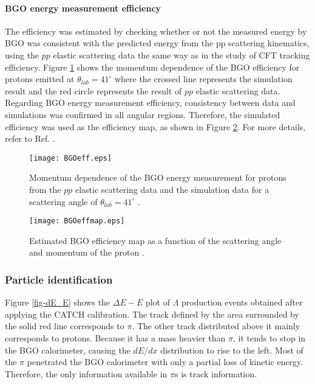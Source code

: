 \vspace{10pt}
\paragraph{BGO energy measurement efficiency }
The efficiency was estimated by checking whether or not the measured energy by BGO was consistent with the predicted energy from the pp scattering kinematics, using the $pp$ elastic scattering data the same way as in the study of CFT tracking efficiency. Figure \ref{fig-BGOeff}  shows the momentum dependence of the
BGO efficiency for protons emitted at $\theta_{lab}=41^{\circ}$ where the crossed line represents the simulation result and the red circle represents the result of $pp$ elastic scattering data. Regarding BGO energy measurement efficiency, consistency between data and simulations was confirmed in all angular regions. Therefore, the simulated efficiency was used as the efficiency map, as shown in Figure \ref{fig-BGOeffmap}. For more details, refer to Ref. \cite{Miwa-SMp}.

\begin{figure}[!h]
  \begin{center}
    \texttt{[image: BGOeff.eps]}
    \caption{Momentum dependence of the BGO energy measurement for protons from the $pp$ elastic scattering data and the simulation data for a scattering angle of $\theta_{lab}=41^{\circ}$ \cite{Miwa-SMp}.}
    \label{fig-BGOeff}
  \end{center}
\end{figure}

\begin{figure}[!h]
  \begin{center}
    \texttt{[image: BGOeffmap.eps]}
    \caption{Estimated BGO efficiency map as a function of the scattering angle and momentum of the proton \cite{Miwa-SMp}.}
    \label{fig-BGOeffmap}
  \end{center}
\end{figure}


\subsubsection{Particle identification}
Figure \ref{fig-dE_E} shows the $\Delta E-E$ plot of $\Lambda$ production events obtained after applying the CATCH calibration. The track defined by the area surrounded by the solid red line corresponds to $\pi$. The other track distributed above it mainly corresponds to protons. Because it has a mass heavier than $\pi$, it tends to stop in the BGO calorimeter, causing the $dE/dx$ distribution to rise to the left. Most of the $\pi$ penetrated the BGO calorimeter with only a partial loss of kinetic energy. Therefore, the only information available in $\pi$s is track information.

